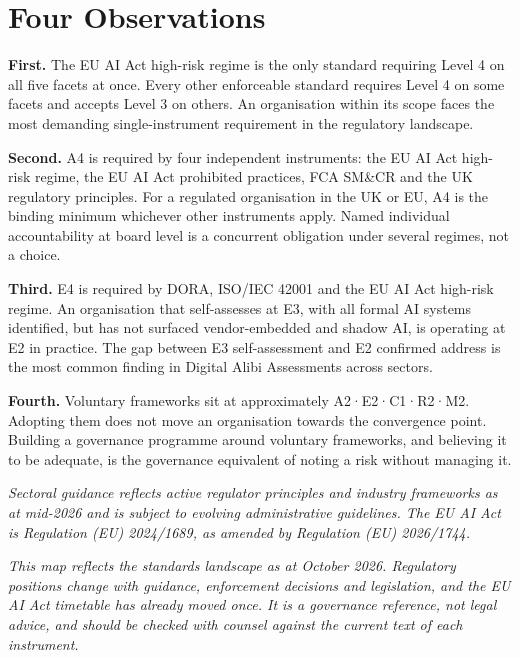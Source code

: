 \section{Four Observations}

\textbf{First.} The EU AI Act high-risk regime is the only standard requiring Level 4 on all five facets at once. Every other enforceable standard requires Level 4 on some facets and accepts Level 3 on others. An organisation within its scope faces the most demanding single-instrument requirement in the regulatory landscape.

\textbf{Second.} A4 is required by four independent instruments: the EU AI Act high-risk regime, the EU AI Act prohibited practices, FCA SM\&CR and the UK regulatory principles. For a regulated organisation in the UK or EU, A4 is the binding minimum whichever other instruments apply. Named individual accountability at board level is a concurrent obligation under several regimes, not a choice.

\textbf{Third.} E4 is required by DORA, ISO/IEC 42001 and the EU AI Act high-risk regime. An organisation that self-assesses at E3, with all formal AI systems identified, but has not surfaced vendor-embedded and shadow AI, is operating at E2 in practice. The gap between E3 self-assessment and E2 confirmed address is the most common finding in Digital Alibi Assessments across sectors.

\textbf{Fourth.} Voluntary frameworks sit at approximately A2·E2·C1·R2·M2. Adopting them does not move an organisation towards the convergence point. Building a governance programme around voluntary frameworks, and believing it to be adequate, is the governance equivalent of noting a risk without managing it.

\emph{Sectoral guidance reflects active regulator principles and industry frameworks as at mid-2026 and is subject to evolving administrative guidelines. The EU AI Act is Regulation (EU) 2024/1689, as amended by Regulation (EU) 2026/1744.}

\emph{This map reflects the standards landscape as at October 2026. Regulatory positions change with guidance, enforcement decisions and legislation, and the EU AI Act timetable has already moved once. It is a governance reference, not legal advice, and should be checked with counsel against the current text of each instrument.}
